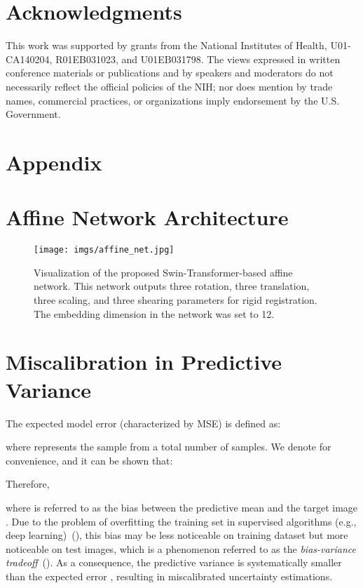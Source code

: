 \documentclass[times,twocolumn,final]{elsarticle}
\begin{document}
\section*{Acknowledgments}
This work was supported by grants from the National Institutes of Health, U01-CA140204, R01EB031023, and U01EB031798. The views expressed in written conference materials or publications and by speakers and moderators do not necessarily reflect the official policies of the NIH; nor does mention by trade names, commercial practices, or organizations imply endorsement by the U.S. Government.
\onecolumn
\appendix
\section*{Appendix}
\section{Affine Network Architecture}
\begin{figure*}[!h]
\centering
\texttt{[image: imgs/affine\_net.jpg]}
\caption{Visualization of the proposed Swin-Transformer-based affine network. This network outputs three rotation, three translation, three scaling, and three shearing parameters for rigid registration. The embedding dimension  in the network was set to 12. \label{fig:affine_arch}}
\end{figure*}
\section{Miscalibration in Predictive Variance}
\label{app:mis_cal}
The expected model error (characterized by MSE) is defined as:
\begin{linenomath}

\end{linenomath}
where  represents the  sample from a total number of  samples. We denote  for convenience, and it can be shown that:
\begin{linenomath}

\end{linenomath}
Therefore,
\begin{linenomath}

\end{linenomath}
where  is referred to as the bias between the predictive mean  and the target image . Due to the problem of overfitting the training set in supervised algorithms (e.g., deep learning)~(\cite{bishop2006pattern}), this bias may be less noticeable on training dataset but more noticeable on test images, which is a phenomenon referred to as the \textit{bias-variance tradeoff}~(\cite{friedman2017elements}). As a consequence, the predictive variance  is systematically smaller than the expected error , resulting in miscalibrated uncertainty estimations.
\newpage
\end{document}
